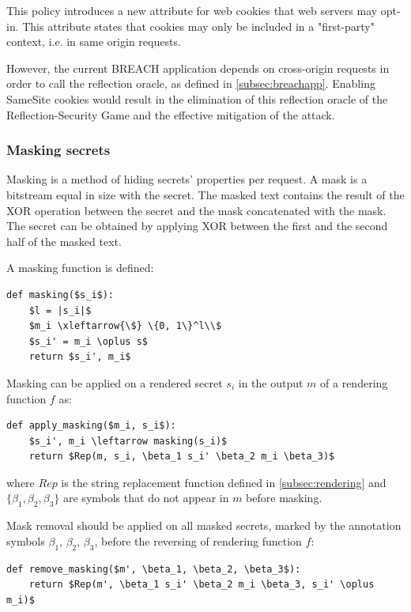 \documentclass[conference, letterpaper, 10pt]{IEEEtran}
\begin{document}
This policy introduces a new attribute for web cookies that web servers may
opt-in. This attribute states that cookies may only be included in a
"first-party" context, i.e. in same origin requests.

However, the current BREACH application depends on cross-origin requests in
order to call the reflection oracle, as defined in \ref{subsec:breachapp}.
Enabling SameSite cookies would result in the elimination of this reflection
oracle of the Reflection-Security Game and the effective mitigation of the
attack.

\subsubsection{Masking secrets}\label{subsec:masking}
Masking is a method of hiding secrets' properties per request. A mask is a
bitstream equal in size with the secret. The masked text contains the result of
the XOR operation between the secret and the mask concatenated with the mask.
The secret can be obtained by applying XOR between the first and the second
half of the masked text.

A masking function is defined:

\begin{lstlisting}[texcl,mathescape]
def masking($s_i$):
    $l = |s_i|$
    $m_i \xleftarrow{\$} \{0, 1\}^l\\$
    $s_i' = m_i \oplus s$
    return $s_i', m_i$
\end{lstlisting}

Masking can be applied on a rendered secret $s_i$ in the output $m$ of a
rendering function $f$ as:

\begin{lstlisting}[texcl,mathescape]
def apply_masking($m_i, s_i$):
    $s_i', m_i \leftarrow masking(s_i)$
    return $Rep(m, s_i, \beta_1 s_i' \beta_2 m_i \beta_3)$
\end{lstlisting}

where $Rep$ is the string replacement function defined in
\ref{subsec:rendering} and $\{\beta_1, \beta_2, \beta_3\}$ are symbols that do not
appear in $m$ before masking.

Mask removal should be applied on all masked secrets, marked by the annotation
symbols $\beta_1$, $\beta_2$, $\beta_3$, before the reversing of rendering function $f$:

\begin{lstlisting}[texcl,mathescape]
def remove_masking($m', \beta_1, \beta_2, \beta_3$):
    return $Rep(m', \beta_1 s_i' \beta_2 m_i \beta_3, s_i' \oplus m_i)$
\end{lstlisting}
\end{document}
